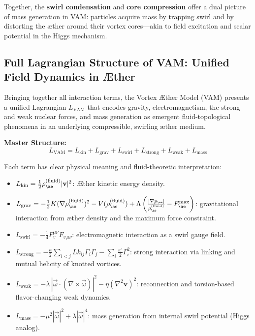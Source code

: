 \medskip
\noindent
Together, the \textbf{swirl condensation} and \textbf{core compression} offer a dual picture of mass generation in VAM: particles acquire mass by trapping swirl and by distorting the æther around their vortex cores—akin to field excitation and scalar potential in the Higgs mechanism.



\subsection{Full Lagrangian Structure of VAM: Unified Field Dynamics in Æther}

Bringing together all interaction terms, the Vortex Æther Model (VAM) presents a unified Lagrangian \( L_{\text{VAM}} \) that encodes gravity, electromagnetism, the strong and weak nuclear forces, and mass generation as emergent fluid-topological phenomena in an underlying compressible, swirling æther medium.

\vspace{1em}
\noindent
\textbf{Master Structure:}
\begin{equation}
\boxed{
L_{\text{VAM}} = L_{\text{kin}} + L_{\text{grav}} + L_{\text{swirl}} + L_{\text{strong}} + L_{\text{weak}} + L_{\text{mass}}
}
\end{equation}

\noindent
Each term has clear physical meaning and fluid-theoretic interpretation:
\begin{itemize}
    \item \( L_{\text{kin}} = \tfrac{1}{2} \rho_{\ae}^{(\text{fluid})} |\mathbf{v}|^2 \): Æther kinetic energy density.

    \item \( L_{\text{grav}} = -\tfrac{1}{2} K (\nabla \rho_{\ae}^{(\text{fluid})})^2 - V(\rho_{\ae}^{(\text{fluid})}) + \Lambda\left(\frac{|\nabla p_{\ae}|}{\rho_{\ae}^{(\text{fluid})}} - F^{\max}_{\ae} \right) \): gravitational interaction from æther density and the maximum force constraint.

    \item \( L_{\text{swirl}} = -\tfrac{1}{4} F^{\mu\nu}_{v} F_{v\,\mu\nu} \): electromagnetic interaction as a swirl gauge field.

    \item \( L_{\text{strong}} = -\tfrac{\kappa}{2} \sum_{i<j} Lk_{ij} \Gamma_i \Gamma_j - \sum_i \tfrac{\kappa'}{2} \Gamma_i^2 \): strong interaction via linking and mutual helicity of knotted vortices.

    \item \( L_{\text{weak}} = -\lambda \, \left|\vec{\omega} \cdot (\nabla \times \vec{\omega}) \right|^2 - \eta (\nabla^2 \mathbf{v})^2 \): reconnection and torsion-based flavor-changing weak dynamics.

    \item \( L_{\text{mass}} = -\mu^2 |\vec{\omega}|^2 + \lambda |\vec{\omega}|^4 \): mass generation from internal swirl potential (Higgs analog).
\end{itemize}

